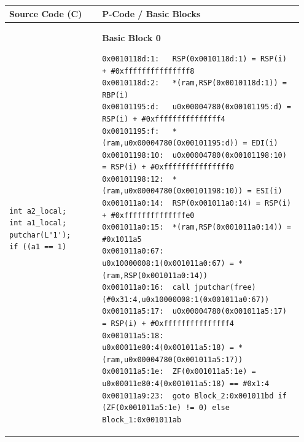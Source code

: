 \begin{longtable}{|p{0.30\linewidth}|p{0.65\linewidth}|}
    \hline
    \textbf{Source Code (C)} & \textbf{P-Code / Basic Blocks} \\ 
    \hline
    \endhead
    \begin{minipage}[t]{\linewidth}
        \vspace{1mm}
        \begin{lstlisting}[style=CStyle]
int a2_local;
int a1_local;
putchar(L'1');
if ((a1 == 1)
        \end{lstlisting}
        \vspace{1mm}
    \end{minipage} 
    & 
    \begin{minipage}[t]{\linewidth}
        \vspace{1mm}
        \textbf{\scriptsize Basic Block 0}
        \begin{lstlisting}[style=PCodeStyle]
0x0010118d:1:	RSP(0x0010118d:1) = RSP(i) + #0xfffffffffffffff8
0x0010118d:2:	*(ram,RSP(0x0010118d:1)) = RBP(i)
0x00101195:d:	u0x00004780(0x00101195:d) = RSP(i) + #0xfffffffffffffff4
0x00101195:f:	*(ram,u0x00004780(0x00101195:d)) = EDI(i)
0x00101198:10:	u0x00004780(0x00101198:10) = RSP(i) + #0xfffffffffffffff0
0x00101198:12:	*(ram,u0x00004780(0x00101198:10)) = ESI(i)
0x001011a0:14:	RSP(0x001011a0:14) = RSP(i) + #0xffffffffffffffe0
0x001011a0:15:	*(ram,RSP(0x001011a0:14)) = #0x1011a5
0x001011a0:67:	u0x10000008:1(0x001011a0:67) = *(ram,RSP(0x001011a0:14))
0x001011a0:16:	call jputchar(free)(#0x31:4,u0x10000008:1(0x001011a0:67))
0x001011a5:17:	u0x00004780(0x001011a5:17) = RSP(i) + #0xfffffffffffffff4
0x001011a5:18:	u0x00011e80:4(0x001011a5:18) = *(ram,u0x00004780(0x001011a5:17))
0x001011a5:1e:	ZF(0x001011a5:1e) = u0x00011e80:4(0x001011a5:18) == #0x1:4
0x001011a9:23:	goto Block_2:0x001011bd if (ZF(0x001011a5:1e) != 0) else Block_1:0x001011ab
        \end{lstlisting}
        \vspace{1mm}
    \end{minipage} 
    \\ \hline


\end{longtable}

